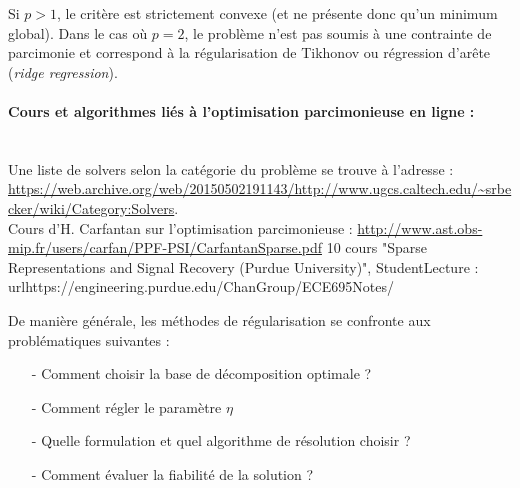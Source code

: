 Si $p>1$, le critère est strictement convexe (et ne présente donc qu'un minimum global). Dans le cas où $p=2$, le problème n'est pas soumis à une contrainte de parcimonie et correspond à la régularisation de Tikhonov ou régression d'arête (\textit{ridge regression}).


\paragraph{Cours et algorithmes liés à l'optimisation parcimonieuse en ligne :}~\\
Une liste de solvers selon la catégorie du problème se trouve à l'adresse : \url{https://web.archive.org/web/20150502191143/http://www.ugcs.caltech.edu/~srbecker/wiki/Category:Solvers}.\\
Cours d'H. Carfantan sur l'optimisation parcimonieuse : \url{http://www.ast.obs-mip.fr/users/carfan/PPF-PSI/CarfantanSparse.pdf}
10 cours  "Sparse Representations and Signal Recovery (Purdue University)", StudentLecture : url{https://engineering.purdue.edu/ChanGroup/ECE695Notes/}



De manière générale, les méthodes de régularisation se confronte aux problématiques suivantes : 
\begin{itemize}
	\item[-] Comment choisir la base de décomposition optimale ?
	\item[-] Comment régler le paramètre $\eta$
	\item[-] Quelle formulation et quel algorithme de résolution choisir ?
	\item[-] Comment évaluer la fiabilité de la solution ?
\end{itemize}






\todo[inline]{
The polar correlation technique , FISHER
}
